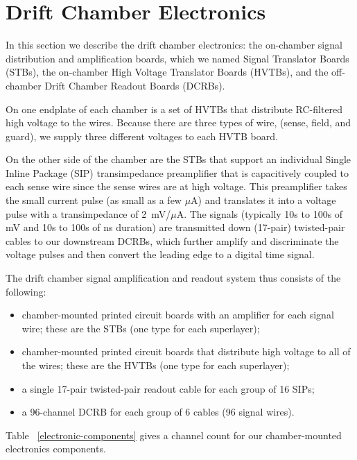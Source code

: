 \section{Drift Chamber Electronics}

In this section we describe the drift chamber electronics:
the on-chamber signal distribution and amplification boards, which
we named Signal Translator Boards (STBs),
the on-chamber High Voltage Translator Boards (HVTBs), and the
off-chamber Drift Chamber Readout Boards (DCRBs).

On one endplate of each chamber is a set of HVTBs that distribute RC-filtered high voltage
to the wires.  Because there are three types of wire, (sense, field, and guard), we supply
three different voltages to each HVTB board.  

On the other side of the chamber are the STBs that support an individual Single Inline Package
(SIP) transimpedance preamplifier that is capacitively coupled to each sense wire since the
sense wires are at high voltage.  This preamplifier takes the
small current pulse (as small as a few $\mu$A) and translates it into a voltage 
pulse with a transimpedance of 2~mV/$\mu$A.  The signals (typically
10s to 100s of mV and 10s to 100s of ns duration) are
transmitted down (17-pair) twisted-pair cables to our downstream DCRBs, which further amplify and
discriminate the voltage pulses and then convert the leading edge
to a digital time signal.

The drift chamber signal amplification and readout system thus consists of the following:
\begin{itemize}
\item  chamber-mounted printed circuit boards with an amplifier for each signal wire; 
these are the STBs (one type for each superlayer);
\item  chamber-mounted printed circuit boards that distribute high voltage
to all of the wires; these are the HVTBs (one type for each superlayer);
\item a single 17-pair twisted-pair readout cable for each group of 16
SIPs;
\item a 96-channel DCRB for each group of 6 cables (96 signal wires).
\end{itemize}

Table ~\ref{electronic-components} gives a channel count for our chamber-mounted electronics components.

